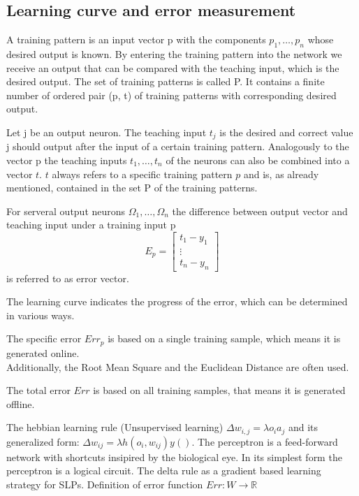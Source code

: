 \subsection{Learning curve and error measurement}
\begin{definition}
    A training pattern is an input vector p with the components $p_{1}, \ldots,p_{n}$ whose desired output is known. By entering the training pattern into the network we receive an output that can be compared with the teaching input, which is the desired output. The set of training patterns is called P. It contains a finite number of ordered pair (p, t) of training patterns with corresponding desired output.
\end{definition}
\begin{definition}
    Let j be an output neuron. The teaching input $t_j$ is the desired and correct value j should output after the input of a certain training pattern. Analogously to the vector p the teaching inputs $t_{1}, \ldots,t_{n}$ of the neurons can also be combined into a vector $t$. $t$ always refers to a specific training pattern $p$ and is, as already mentioned, contained in the set P of the training patterns.
\end{definition}
\begin{definition}
    For serveral output neurons $\Omega_{1}, \ldots,\Omega_{n}$ the difference between output vector and teaching input under a training input p
    \[ 
        E_p = \begin{bmatrix}
            t_1-y_1 \\
            \vdots\\
            t_n-y_n
        \end{bmatrix} 
    \]is referred to as error vector. 
\end{definition}
The learning curve indicates the progress of the error, which can be determined in various ways.
\begin{definition}
    The specific error $Err_p$ is based on a single training sample, which means it is generated online.\\
    Additionally, the Root Mean Square and the Euclidean Distance are often used.
\end{definition}
\begin{definition}
    The total error $Err$ is based on all training samples, that means it is generated offline.
\end{definition}
The hebbian learning rule (Unsupervised learning) $\Delta w_{i,j} = \lambda o_i a_j$ and its generalized form: $\Delta w_{ij} = \lambda h(o_i,w_{ij})y()$. The perceptron is a feed-forward network with shortcuts insipired by the biological eye. In its simplest form the perceptron is a logical circuit. The delta rule as a gradient based learning strategy for SLPs. Definition of error function $Err : W \longrightarrow \mathbb{R}$

